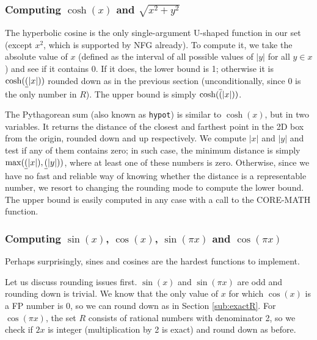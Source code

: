\subsubsection{Computing $\cosh(x)$ and $\sqrt{x^2+y^2}$}
The hyperbolic cosine is the only single-argument U-shaped function in our set (except $x^2$, which is supported by NFG already). 
To compute it, we take the absolute value of $x$ (defined as the interval of all possible values of $|y|$ for all $y\in x$) and see if it contains 0. 
If it does, the lower bound is 1; otherwise it is $\cosh(\underline{(}|x|))$ rounded down as in the previous section (unconditionally, since 0 is the only number in $R$). The upper bound is simply $\cosh(\overline{(}|x|))$.

The Pythagorean sum (also known as \texttt{hypot}) is similar to $\cosh(x)$, but in two variables. It returns the distance of the closest and farthest point in the 2D box from the origin, rounded down and up respectively.
We compute $|x|$ and $|y|$ and test if any of them contains zero; in such case, the minimum distance is simply $\max(\underline{(}|x|), \underline{(}|y|))$, where at least one of these numbers is zero.
Otherwise, since we have no fast and reliable way of knowing whether the distance is a representable number, we resort to changing the rounding mode to compute the lower bound.
The upper bound is easily computed in any case with a call to the CORE-MATH function.

\subsubsection{Computing $\sin(x)$, $\cos(x)$, $\sin(\pi x)$ and $\cos(\pi x)$}
Perhaps surprisingly, sines and cosines are the hardest functions to implement.

Let us discuss rounding issues first. $\sin(x)$ and $\sin(\pi x)$ are odd and rounding down is trivial.
We know that the only value of $x$ for which $\cos(x)$ is a FP number is $0$, so we can round down as in Section \ref{sub:exactR}. 
For $\cos(\pi x)$, the set $R$ consists of rational numbers with denominator 2, so we check if $2x$ is integer (multiplication by 2 is exact) and round down as before.

